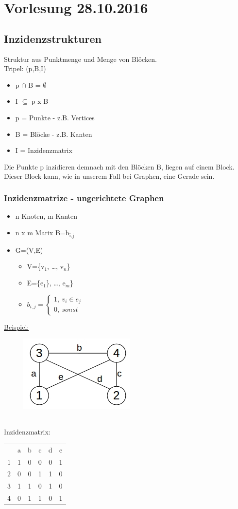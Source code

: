 \section{Vorlesung 28.10.2016}
\subsection{Inzidenzstrukturen}
Struktur aus Punktmenge und Menge von Blöcken.\\
Tripel: (p,B,I)
\begin{itemize}
	\item p $\cap$ B = $\emptyset$
	\item I $\subseteq$ p x B
	\item p = Punkte - z.B. Vertices
	\item B = Blöcke - z.B. Kanten
	\item I = Inzidenzmatrix
\end{itemize}
Die Punkte p \glqq inzidieren\grqq{} demnach mit den Blöcken B, \glqq liegen auf\grqq{} einem Block. Dieser Block kann, wie in unserem Fall bei Graphen, eine Gerade sein.

\subsubsection{Inzidenzmatrize - ungerichtete Graphen}
\begin{itemize}
	\item n Knoten, m Kanten
	\item n x m Marix B=b\textsubscript{i,j}
	\item G=(V,E)
	\begin{itemize}
		\item V=\{v$_1$, \ldots, v$_n$\}
		\item E=\{e$_1$\}, \ldots, e$_m$\}
		\item $b_{i,j}=
			\begin{cases}
				1,\>v_{i}\in e_j\\
				0,\>sonst
			\end{cases}$
	\end{itemize}
\end{itemize}

\underline{Beispiel:}
\begin{figure}[htp]
\includegraphics[scale=1.00]{lectures/161028/pix/pic1.jpg}
\end{figure}
\\
Inzidenzmatrix: 
\begin{tabular}{cccccc}
  & a & b & c & d & e\\
1 & 1 & 0 & 0 & 0 & 1\\
2 & 0 & 0 & 1 & 1 & 0\\
3 & 1 & 1 & 0 & 1 & 0\\
4 & 0 & 1 & 1 & 0 & 1\\
\end{tabular}

